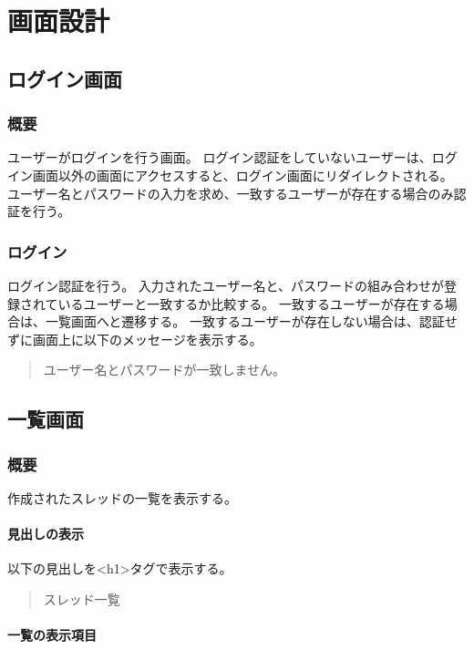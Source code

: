 \chapter{画面設計}
    \section{ログイン画面}
        \subsection{概要}
        
ユーザーがログインを行う画面。
ログイン認証をしていないユーザーは、ログイン画面以外の画面にアクセスすると、ログイン画面にリダイレクトされる。
ユーザー名とパスワードの入力を求め、一致するユーザーが存在する場合のみ認証を行う。

        \subsection{ログイン}

ログイン認証を行う。
入力されたユーザー名と、パスワードの組み合わせが登録されているユーザーと一致するか比較する。
一致するユーザーが存在する場合は、一覧画面へと遷移する。
一致するユーザーが存在しない場合は、認証せずに画面上に以下のメッセージを表示する。

\begin{quote}
ユーザー名とパスワードが一致しません。
\end{quote}

    \section{一覧画面}
        \subsection{概要}
作成されたスレッドの一覧を表示する。

            \subsubsection{見出しの表示}
以下の見出しを<h1>タグで表示する。

\begin{quote}
スレッド一覧
\end{quote}

            \subsubsection{一覧の表示項目}


